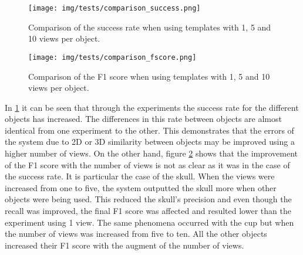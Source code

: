 	\begin{figure}[H]
		\begin{center}
	    \texttt{[image: img/tests/comparison\_success.png]}
		\caption[Comparison of the success rate]{Comparison of the success rate when using templates with 1, 5 and 10 views per object.}
		\label{comparison_success}
		\end{center}
	\end{figure}

	\begin{figure}[H]
		\begin{center}
	    \texttt{[image: img/tests/comparison\_fscore.png]}
		\caption[Comparison of the F1 score]{Comparison of the F1 score when using templates with 1, 5 and 10 views per object.}
		\label{comparison_fscore}
		\end{center}
	\end{figure}


		In \ref{comparison_success} it can be seen that through the experiments the success rate for the different objects has increased. 
	The differences in this rate between objects are almost identical from one experiment to the other. 
	This demonstrates that the errors of the system due to 2D or 3D similarity between objects may be improved using a higher number of views. 
	On the other hand, figure \ref{comparison_fscore} shows that the improvement of the F1 score with the number of views is not as clear as it was in the case of the success rate. 
	It is particular the case of the skull. 
	When the views were increased from one to five, the system outputted the skull more when other objects were being used. 
	This reduced the skull's precision and even though the recall was improved, the final F1 score was affected and resulted lower than the experiment using 1 view.  
	The same phenomena occurred with the cup but when the number of views was increased from five to ten. 
	All the other objects increased their F1 score with the augment of the number of views. 


